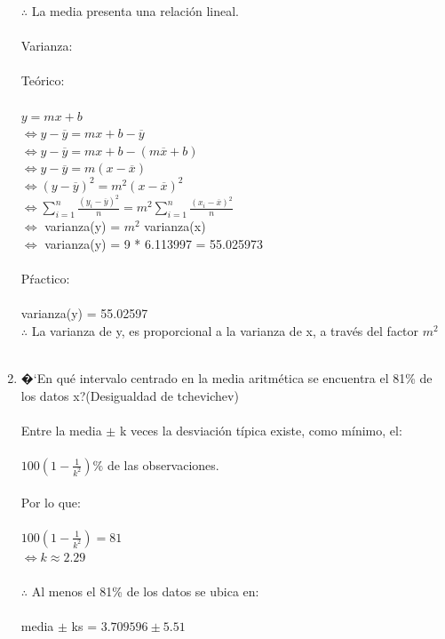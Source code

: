 \documentclass[letterpaper,spanish,11pt]{article}
\begin{document}
\begin{enumerate}
	$\therefore$ La media presenta una relaci\'on lineal. \\ \\
	
	Varianza: \\ \\
	Te\'orico: \\ \\
	$y = mx + b$ \\
	$\Leftrightarrow y - \overline{y} = mx + b - \overline{y}$ \\
	$\Leftrightarrow y - \overline{y} = mx + b - (m \overline{x} + b)$ \\
	$\Leftrightarrow y - \overline{y} = m(x - \overline{x})$ \\
	$\Leftrightarrow (y - \overline{y})^2 = m^2 (x - \overline{x})^2$ \\
	$\Leftrightarrow \sum_{i=1}^n \frac{(y_i - \overline{y})^2}{n} = m^2 \sum_{i=1}^n \frac{(x_i - \overline{x})^2}{n}$ \\
	$\Leftrightarrow$ varianza(y) = $m^2$ varianza(x) \\
	$\Leftrightarrow$ varianza(y) = 9 * 6.113997 = 55.025973 \\ \\
	P\'ractico: \\ \\
	varianza(y) = 55.02597 \\
	
	$\therefore$ La varianza de y, es proporcional a la varianza de x, a trav\'es del factor $m^2$ \\ \\
    \item �`En qu\'e intervalo centrado en la media aritm\'etica se encuentra el 81\% de los datos x?(Desigualdad de tchevichev)\\ \\
	Entre la media $\pm$ k veces la desviaci\'on t\'ipica existe, como m\'inimo, el: \\ \\
	$100(1 - \frac{1}{k^2})\%$ de las observaciones. \\ \\
	Por lo que: \\ \\
	$100(1 - \frac{1}{k^2}) = 81$\\
	$\Leftrightarrow k \approx 2.29 $ \\ \\
	$\therefore$ Al menos el 81\% de los datos se ubica en:\\ \\
	media $\pm$ ks = $3.709596 \pm 5.51$\\ \\
\end{enumerate}
\end{document}
